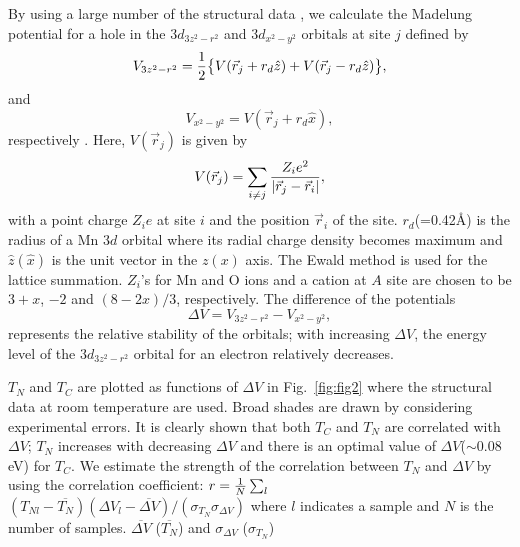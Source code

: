 %
By using a large number of the structural 
data \cite{kubota,argyriou99,laffez,chi,argyriou97,akimoto,battle98,shen,battle96,seshadri,akimoto2,notice}, 
we calculate the Madelung potential for a hole in the $3d_{3z^2-r^2}$ and $3d_{x^2-y^2}$ orbitals 
at site $j$ defined by 
\begin{equation}
V_{3z^2-r^2}={1 \over 2} \bigl \{V(\vec r_j+r_d \hat z)+V(\vec r_j-r_d \hat z) \bigr \}  , 
\end{equation}
and 
\begin{equation}
V_{x^2-y^2}=V(\vec r_j+r_d \hat x) , 
\end{equation} 
respectively \cite{ishihara}.  
%
Here, $V(\vec r_j)$ is given by 
\begin{equation}
V(\vec r_j)=\sum_{i \ne j} {Z_ie^2 \over |\vec r_j -\vec r_i| }, 
\label{eq:sum}
\end{equation}
with a point charge $Z_ie$ at site $i$ and the position $\vec r_i$ of the site.  
$r_d$(=0.42\AA) is the radius of a Mn $3d$ orbital 
where its radial charge density becomes maximum \cite{slater} 
and $\hat z (\hat x)$ is the unit vector in the $z(x)$ axis. 
The Ewald method is used for the lattice summation. 
$Z_i$'s for Mn and O ions and a cation at $A$ site are chosen to be $3+x$, $-2$ and $(8-2x)/3$, respectively. 
%
%
%
The difference of the potentials  
\begin{equation}
\Delta V= V_{3z^2-r^2}-V_{x^2-y^2} , 
\end{equation}
represents the relative stability of the orbitals; 
with increasing $\Delta V$,  
the energy level of the $3d_{3z^2-r^2}$ orbital for an electron relatively decreases. 
%
%
\par
%
$T_N$ and $T_ C$ 
are plotted as functions of $\Delta V$ in Fig.~\ref{fig:fig2} where  
the structural data at room temperature are used. 
Broad shades are drawn by considering experimental errors. 
It is clearly shown that both $T_C$ and $T_N$ are correlated with $\Delta V$; 
$T_N$ increases with decreasing $\Delta V$ and there is an optimal value of 
$\Delta V$($\sim 0.08$ eV) for $T_C$. 
%
We estimate the strength of the correlation between $T_N$ and $\Delta V$ 
by using the correlation coefficient:  
$r={1\over N} \sum_l$
$(T_{Nl}-\overline{T_N})(\Delta V_l-\overline{\Delta V}) / 
(\sigma_{T_N}\sigma_{\Delta V} )
$ 
where $l$ indicates a sample and $N$ is the number of samples. 
$\overline{\Delta V}$ ($\overline{T_N}$) and $\sigma_{\Delta V}$ ($\sigma_{T_N}$)
